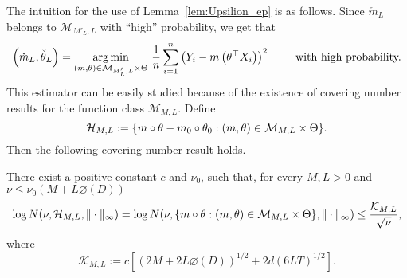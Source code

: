 The intuition for the use of Lemma~\ref{lem:Upsilion_ep} is as follows. Since $\check{m}_L$ belongs to $\mathcal{M}_{M'_L, L}$ with ``high'' probability, we get that
\[
\left(\check{m}_L, \check{\theta}_L\right) = \operatorname*{arg\,min}_{(m,\theta)\in\mathcal{M}_{M'_L, L}\times\Theta}\,\frac{1}{n}\sum_{i=1}^n \left(Y_i - m\left(\theta^{\top}X_i\right)\right)^2~\qquad \text{with high probability.}
\]
This estimator can be easily studied because of the existence of covering number results for the function class $\mathcal{M}_{M, L}$. Define
\[
\mathcal{H}_{M, L} := \{  m\circ\theta-m_0\circ\theta_0 : (m ,\theta) \in \mathcal{M}_{M, L} \times \Theta\}.
\]
Then the following covering number result holds.
\begin{lemma}\label{ent10}
There exist a positive constant $c$ and $\nu_0$, such that, for every $M,L > 0$ and $\nu \le \nu_0(M + L\diameter(D))$
\begin{equation}\label{eq:entropY_H}
\log N(\nu,\mathcal{H}_{M,L},\|\cdot\|_{\infty})= \log N(\nu,\{m\circ\theta : (m, \theta) \in\mathcal{M}_{M,L}\times \Theta\},\|\cdot\|_{\infty}) \le \frac{\mathcal{K}_{M,L}} {\sqrt{\nu}},
\end{equation}
where
\begin{equation}\label{eq:DefMathcalK}
\mathcal{K}_{M,L} := c\left[(2M + 2L\diameter(D))^{1/2} + 2d(6LT)^{1/2}\right].
\end{equation}
\end{lemma}
